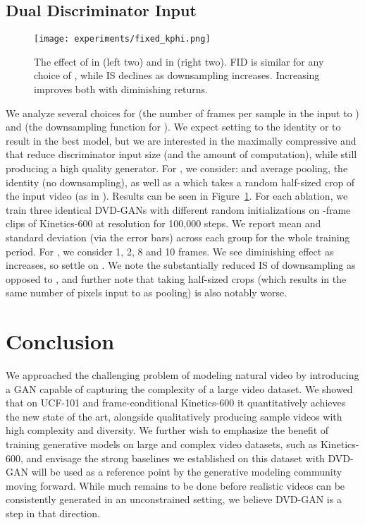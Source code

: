 \documentclass{article} \usepackage{iclr2020_conference,times}
\begin{document}
\subsection{Dual Discriminator Input}
\label{ss:kphi}


\begin{figure}[t]
\centering
\texttt{[image: experiments/fixed\_kphi.png]}
\vspace{-1em}
\caption{The effect of  in  (left two) and  in  (right two). FID is similar for any choice of , while IS declines as downsampling increases. Increasing  improves both with diminishing returns.}
\label{fig:sd_tf}
\end{figure}

We analyze several choices for  (the number of frames per sample in the input to ) and  (the downsampling function for ). We expect setting  to the identity or  to result in the best model, but we are interested in the maximally compressive  and  that reduce discriminator input size (and the amount of computation), while still producing a high quality generator. For , we consider:  and  average pooling, the identity (no downsampling), as well as a  which takes a random half-sized crop of the input video (as in \citet{saito2018tganv2}). Results can be seen in Figure~\ref{fig:sd_tf}.
For each ablation, we train three identical DVD-GANs with different random initializations on -frame clips of Kinetics-600 at  resolution for 100,000 steps. We report mean and standard deviation (via the error bars) across each group for the whole training period. For , we consider 1, 2, 8 and 10 frames. We see diminishing effect as  increases, so settle on . We note the substantially reduced IS of  downsampling as opposed to , and further note that taking half-sized crops (which results in the same number of pixels input to  as  pooling) is also notably worse.

\section{Conclusion}

We approached the challenging problem of modeling natural video by introducing a GAN capable of capturing the complexity of 
a large video dataset. 
We showed that on UCF-101 and frame-conditional Kinetics-600 it quantitatively achieves the new state of the art, alongside qualitatively producing sample videos with high complexity and diversity.
We further wish to emphasize the benefit of training generative models on large and complex video datasets, such as Kinetics-600, and envisage the strong baselines we established on this dataset with DVD-GAN will be used as a reference point by the generative modeling community moving forward. While much remains to be done before realistic videos can be consistently generated in an unconstrained setting, we believe DVD-GAN is a step in that direction.
\end{document}
